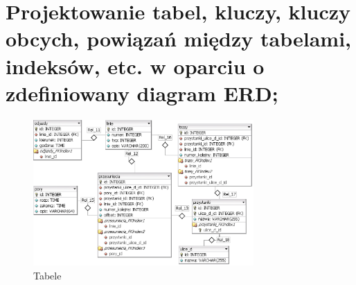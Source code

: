 \section{Projektowanie tabel, kluczy, kluczy obcych, powiązań między tabelami, indeksów, etc. w oparciu o zdefiniowany diagram ERD;} 


\begin{figure}[!htp]
    \centering
    \includegraphics[width=0.75\textwidth]{./img/busag_model.eps}
    \caption{Tabele}
    \label{fig:tabs}
\end{figure}


